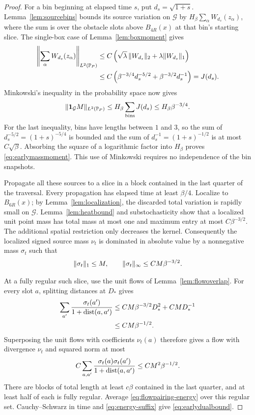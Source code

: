 \begin{proof}
For a bin beginning at elapsed time \(s\), put
\(d_s=\sqrt{1+s}\).  Lemma~\ref{lem:sourcebins} bounds its source
variation on \(\mathcal G\) by
\(H_\beta\sum_\alpha W_{d_s}(z_\alpha)\), where the sum is over
the obstacle slots above \(B_{4R}(x)\) at that bin's starting slice.
The single-box
case of Lemma~\ref{lem:boxmoment} gives
\begin{align*}
 \left\|\sum_\alpha W_{d_s}(z_\alpha)\right\|_{L^2(\mathbb P_P)}
 &\le C\left(\sqrt\lambda\,\lVert W_{d_s}\rVert_2
                +\lambda\lVert W_{d_s}\rVert_1\right)\\
 &\le C\left(\beta^{-3/4}d_s^{-5/2}
                 +\beta^{-3/2}d_s^{-1}\right)=J(d_s).
\end{align*}
Minkowski's inequality in the probability space now gives
\[
 \|\mathbf 1_{\mathcal G}M\|_{L^2(\mathbb P_P)}
 \le H_\beta\sum_{\mathrm{bins}}J(d_s)
 \le H_\beta\beta^{-3/4}.
\]
For the last inequality, bins have lengths between \(1\) and \(3\),
so the sum of \(d_s^{-5/2}=(1+s)^{-5/4}\) is bounded and the sum of
\(d_s^{-1}=(1+s)^{-1/2}\) is at most \(C\sqrt\beta\).
Absorbing the square of a logarithmic factor into \(H_\beta\)
proves \eqref{eq:earlymassmoment}.  This use of Minkowski requires
no independence of the bin snapshots.

Propagate all these sources to a slice in a block contained in the
last quarter of the traversal.  Every propagation has elapsed time
at least \(\beta/4\).  Localize to \(B_{6R}(x)\); by
Lemma~\ref{lem:localization}, the discarded total variation is
rapidly small on \(\mathcal G\).  Lemma~\ref{lem:heatbound}
and substochasticity show that a localized unit point mass has total
mass at most one and maximum entry at most \(C\beta^{-3/2}\).
The additional spatial restriction only decreases the kernel.
Consequently the localized signed source mass \(\nu_t\) is
dominated in absolute value by a nonnegative mass \(\sigma_t\)
such that
\[
 \lVert \sigma_t\rVert_1\le M,
 \qquad
 \lVert \sigma_t\rVert_\infty\le CM\beta^{-3/2}.
\]

At a fully regular such slice, use the unit flows of
Lemma~\ref{lem:flowoverlap}.  For every slot \(a\), splitting
distances at \(D_*\) gives
\begin{align*}
 \sum_{a'}\frac{\sigma_t(a')}{1+\operatorname{dist}(a,a')}
 &\le CM\beta^{-3/2}D_*^2+CM D_*^{-1}\\
 &\le CM\beta^{-1/2}.
\end{align*}
Superposing the unit flows with coefficients \(\nu_t(a)\) therefore
gives a flow with divergence \(\nu_t\) and squared norm at most
\[
 C\sum_{a,a'}\frac{\sigma_t(a)\sigma_t(a')}
                         {1+\operatorname{dist}(a,a')}
 \le CM^2\beta^{-1/2}.
\]
There are blocks of total length at least \(c\beta\) contained
in the last quarter, and at least half of each is fully regular.
Average \eqref{eq:flowpairing-energy} over this regular set.
Cauchy--Schwarz in time and \eqref{eq:energy-suffix} give
\eqref{eq:earlydualbound}.
\end{proof}

